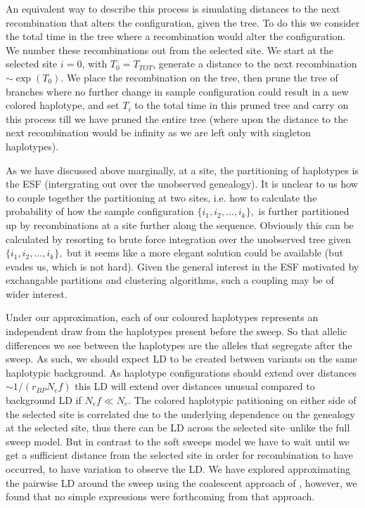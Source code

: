 \documentclass[a4paper,10pt]{article}
\begin{document}
An equivalent way to describe this process is simulating distances to the next recombination that alters the configuration, given the tree. To do this we consider the total time in the tree where a recombination would alter the configuration. We number these recombinations out from the selected site. We start at the selected site $i=0$, with $T_0 = T_{TOT}$, generate a distance to the next recombination $\sim \exp(T_0)$. We place the recombination on the tree, then prune the tree of branches where no further change in sample configuration could result in a new colored haplotype, and set $T_i$ to the total time in this pruned tree and carry on this process till we have pruned the entire tree (where upon the distance to the next recombination would be infinity as we are left only with singleton haplotypes). 

As we have discussed above marginally, at a site, the partitioning of haplotypes is the ESF (intergrating out over the unobserved genealogy). It is unclear to us how to couple together the partitioning at two sites, i.e. how to calculate the probability of  how the sample configuration $ \{i_1,i_2,\dots,i_k\},$ is further partitioned up by recombinations at a site further along the sequence. Obviously this can be calculated by resorting to brute force integration over the unobserved tree given $\{i_1,i_2,\dots,i_k\},$ but it seems like a more elegant solution could be available (but evades us, which is not hard). Given the general interest in the ESF motivated by exchangable partitions and clustering algorithms, such a coupling may be of wider interest. 
 
Under our approximation, each of our coloured haplotypes represents an independent draw from the haplotypes present before the sweep. So that allelic differences we see between the haplotypes are the alleles that segregate after the sweep. As such, we should expect LD to be created between variants on the same haplotypic background. As haplotype configurations should extend over distances $\sim 1/(r_{BP} N_e f)$ this LD will extend over distances unusual compared to background LD if $N_e f \ll N_e$. The colored haplotypic patitioning on either side of the selected site is correlated due to the underlying dependence on the genealogy at the selected site, thus there can be LD across the selected site--unlike the full sweep model. But in contrast to the soft sweeps model we have to wait until we get a sufficient distance from the selected site in order for recombination to have occurred, to have variation to observe the LD. We have explored approximating the pairwise LD around the sweep using the coalescent approach of \citet{McVean:2006ke}, however, we found that no simple expressions were forthcoming from that approach.
\end{document}
